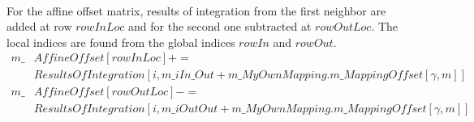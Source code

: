 \documentclass[BoSSSForSolvingConservationLaws.tex]{subfiles}
\begin{document}
\begin{itemize}
\begin{align*}
\end{align*}
For the affine offset matrix, results of integration from the first neighbor are added at row $rowInLoc$ and for the second one subtracted at $rowOutLoc$. The local indices are found from the global indices $rowIn$ and $rowOut$.
\begin{align*}
m\_&AffineOffset[rowInLoc] +=\\ &ResultsOfIntegration[i, m\_iIn\_Out + m\_MyOwnMapping.m\_MappingOffset[\gamma, m]]\\
m\_&AffineOffset[rowOutLoc] -=\\ &ResultsOfIntegration[i, m\_iOutOut + m\_MyOwnMapping.m\_MappingOffset[\gamma, m]]\\
\end{align*}
\end{itemize}
\end{document}
